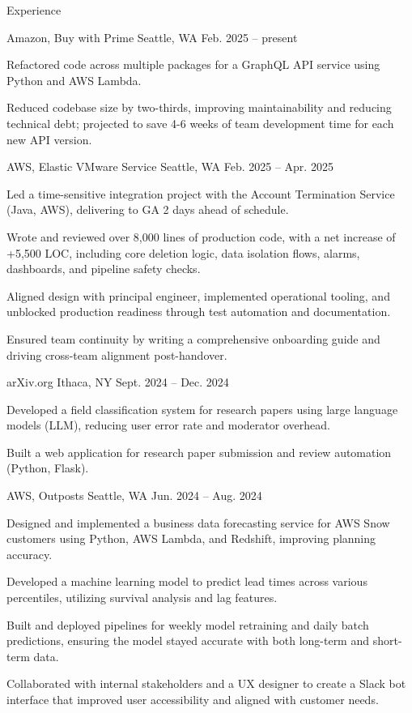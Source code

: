 \documentclass[10pt]{article}
\begin{document}
\begin{customsection}{Experience}

    {Amazon, Buy with Prime}
    {Seattle, WA}
    {Feb. 2025 -- present}
    {
        \item Refactored code across multiple packages for a GraphQL API service using Python and AWS Lambda.
        \item Reduced codebase size by two-thirds, improving maintainability and reducing technical debt; projected to save 4-6 weeks of team development time for each new API version.
    }

    {AWS, Elastic VMware Service}
    {Seattle, WA}
    {Feb. 2025 -- Apr. 2025}
    {
        \item Led a time-sensitive integration project with the Account Termination Service (Java, AWS), delivering to GA 2 days ahead of schedule.
        \item Wrote and reviewed over 8,000 lines of production code, with a net increase of +5,500 LOC, including core deletion logic, data isolation flows, alarms, dashboards, and pipeline safety checks.
        \item Aligned design with principal engineer, implemented operational tooling, and unblocked production readiness through test automation and documentation.
        \item Ensured team continuity by writing a comprehensive onboarding guide and driving cross-team alignment post-handover.
    }

    {arXiv.org} 
    {Ithaca, NY} 
    {Sept. 2024 -- Dec. 2024}
    {
        \item Developed a field classification system for research papers using large language models (LLM), reducing user error rate and moderator overhead.
        \item Built a web application for research paper submission and review automation (Python, Flask).
    }

    {AWS, Outposts} 
    {Seattle, WA} 
    {Jun. 2024 -- Aug. 2024}
    {
        \item Designed and implemented a business data forecasting service for AWS Snow customers using Python, AWS Lambda, and Redshift, improving planning accuracy.
        \item Developed a machine learning model to predict lead times across various percentiles, utilizing survival analysis and lag features.
        \item Built and deployed pipelines for weekly model retraining and daily batch predictions, ensuring the model stayed accurate with both long-term and short-term data.
        \item Collaborated with internal stakeholders and a UX designer to create a Slack bot interface that improved user accessibility and aligned with customer needs.
    }


\end{customsection}
\end{document}
